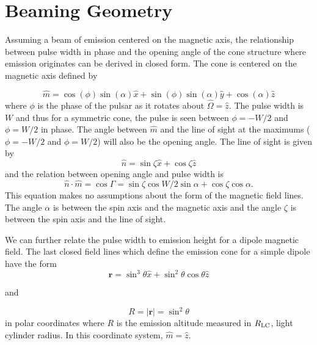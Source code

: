 \section{Beaming Geometry}
\label{sec:beamingGeometry}
Assuming a beam of emission centered on the 
magnetic axis, the
relationship between pulse width
in phase and the opening angle of the
cone structure where emission originates
can be derived in closed form.
The cone is centered on the magnetic 
axis defined by 

\begin{equation}
\label{equ:m}
\hat{m}=\cos{(\phi)} \sin{(\alpha)} \hat{x} + \sin{(\phi)} \sin{(\alpha)} \hat{y} + \cos{(\alpha)} \hat{z}
\end{equation}
where $\phi$ is the phase of the pulsar
as it rotates about $\hat{\Omega}=\hat{z}$.
The pulse width is $W$ and thus
for a symmetric cone, the 
pulse is seen between $\phi=-W/2$ and $\phi=W/2$
in phase.
The angle between $\hat{m}$ and the
line of sight at the maximums ($\phi=-W/2$ and $\phi=W/2$) will also be the opening
angle.  The line of sight is given by 
\begin{equation}
\hat{n}=\sin{\zeta} \hat{x}+\cos{\zeta} \hat{z}
\end{equation}
and the relation between opening angle and 
pulse width is
\begin{equation}
\label{equ:ndotm}
\hat{n}\cdot\hat{m}=\cos{\Gamma}=\sin{\zeta} \cos{W/2} \sin{\alpha} + \cos{\zeta} \cos{\alpha} 
.\end{equation}
This equation makes no assumptions about the form of the magnetic field lines.
The angle $\alpha$ is between the spin axis and the magnetic axis and the
angle $\zeta$ is between the spin axis and the line of sight.

We can further relate the pulse width to emission height for a
dipole magnetic field.  The last closed field lines
which define the emission cone for a simple dipole
have the form 
\begin{equation}
\label{equ:dipole}
\mathbf{r}=\sin^3\theta \hat{x} + \sin^2\theta \cos{\theta} \hat{z}
\end{equation}
\begin{center}
and
\end{center}
\begin{equation}
R=|\mathbf{r}|=\sin^2\theta
\end{equation}
in polar coordinates where $R$ is the emission 
altitude measured in $R_{\rm LC}$, light cylinder
radius.
In this coordinate system, $\hat{m}=\hat{z}$.

